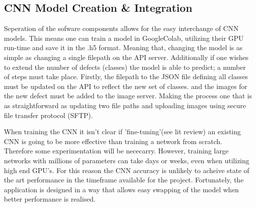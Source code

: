     \subsection{CNN Model Creation \& Integration}
      Seperation of the sofware components allows for the easy interchange of CNN models. This means one can train a model in GoogleColab, utilizing their GPU run-time and save it in the .h5 format. Meaning that, changing the model is as simple as changing a single filepath on the API server. Additionally if one wishes to extend the number of defects (classes) the model is able to predict; a number of steps must take place. Firstly, the filepath to the JSON file defining all classes must be updated on the API to reflect the new set of classes. and the images for the new defect must be added to the image server. Making the process one that is as straightforward as updating two file paths and uploading images using secure file transfer protocol (SFTP).
      \par
      When training the CNN it isn't clear if 'fine-tuning'(see lit review) an existing CNN is going to be more effective than training a network from scratch. Therefore some experimentation will be nececarry. However, training large networks with millions of parameters can take days or weeks, even when utilizing high end GPU's. For this reason the CNN accuracy is unlikely to acheive state of the art performance in the timeframe available for the project. Fortunately, the application is designed in a way that allows easy swapping of the model when better performance is realised.
      \par
